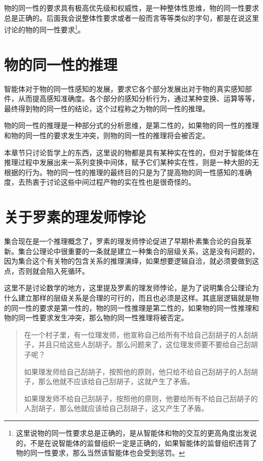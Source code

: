 \documentclass[12pt,oneside]{book}
\begin{document}
物的同一性的要求具有极高优先级和权威性，是一种整体性思维，物的同一性要求总是正确的。后面我会说整体性要求或者一般而言等等类似的字句，都是在说这里讨论的物的同一性要求\footnote{这里说物的同一性要求总是正确的，是从智能体和物的交互的更高角度出发说的，不是在说智能体的监督组织一定是正确的，如果智能体的监督组织违背了物的同一性要求，那么当然该智能体也会受到惩罚。}。


\section{物的同一性的推理}
智能体对于物的同一性感知的发展，要求它各个部分发展出对于物的真实感知部件，从而提高感知准确度。各个部分的感知分析行为，通过某种变换、运算等等，最终得到物的同一性的结论，这个过程称之为物的同一性的推理。

物的同一性的推理是一种部分式的分析思维，是第二性的，如果物的同一性的推理和物的同一性的要求发生冲突，则物的同一性的推理将会被否定。

本章节只讨论哲学上的东西，这里说的物都是具有某种实在性的，但对于智能体在推理过程中发展出来一系列变换中间体，赋予它们某种实在性，则是一种大胆的无根据的行为。物的同一性的推理的最终目的只是为了提高物的同一性感知的准确度，去热衷于讨论这些中间过程产物的实在性也是很奇怪的。

\section{关于罗素的理发师悖论}
集合现在是一个推理概念了，罗素的理发师悖论促进了早期朴素集合论的自我革新。集合公理论中很重要的一条就是建立一种集合的层级关系，这是没有问题的，因为集合这个有关物的包含关系的推理演绎，如果想要逻辑自洽，就必须要做到这点，否则就会陷入死循环。

这里不是讨论数学的地方，这里提及罗素的理发师悖论，是为了说明集合公理论为什么建立那样的层级关系是合理的可行的，而且也必须是这样。其底层逻辑就是物的同一性的要求是第一性的，物的同一性推理是第二性的，如果物的同一性推理和物的同一性要求发生冲突，那么物的同一性推理将被否定。

\begin{quote}
在一个村子里，有一位理发师，他宣称自己给所有不给自己刮胡子的人刮胡子，并且只给这些人刮胡子。那么问题来了，这位理发师要不要给自己刮胡子呢？

如果理发师给自己刮胡子，按照他的原则，他只给不给自己刮胡子的人刮胡子，那么他就不应该给自己刮胡子，这就产生了矛盾。

如果理发师不给自己刮胡子，按照他的原则，他要给所有不给自己刮胡子的人刮胡子，那么他就应该给自己刮胡子，这又产生了矛盾。
\end{quote}
\end{document}
